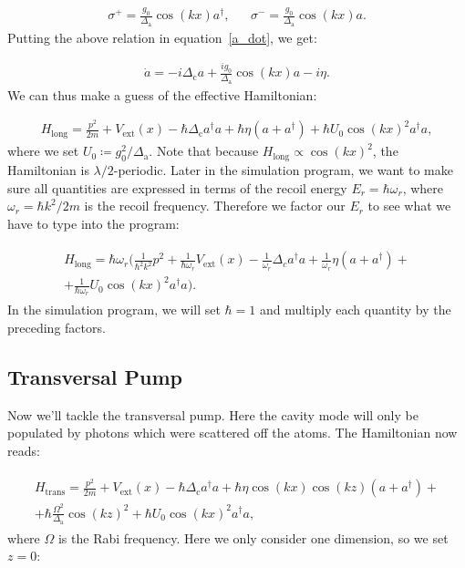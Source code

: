 \begin{align}
\sigma^+ = \frac{g_0 }{\Delta_\text{a}} \cos(kx) a^\dagger, && \sigma^- = \frac{g_0 }{\Delta_\text{a}} \cos(kx) a.
\end{align}Putting the above relation in equation~\ref{a_dot}, we get:

\begin{align}
\dot{a} = -i \Delta_\text{c} a + \frac{i g_0}{\Delta_\text{a}}  \cos(kx) a - i \eta.
\end{align}We can thus make a guess of the effective Hamiltonian:

\begin{align}
H_\text{long} = \frac{p^2}{2m} + V_\text{ext}(x) - \hbar \Delta_\text{c} a^\dagger a + \hbar \eta (a + a^\dagger) + \hbar U_0 \cos(kx)^2 a^\dagger a,
\end{align}where we set $U_0 \coloneqq g_0^2 / \Delta_\text{a}$. Note that because $H_\text{long} \propto \cos(kx)^2$, the Hamiltonian is $\lambda / 2$-periodic. Later in the simulation program, we want to make sure all quantities are expressed in terms of the recoil energy $E_r = \hbar \omega_r$, where $\omega_r = \hbar k^2 / 2m$ is the recoil frequency. Therefore we factor our $E_r$ to see what we have to type into the program:

\begin{align}
\begin{split}
H_\text{long} = \hbar \omega_r \biggl( \frac{1}{\hbar^2 k^2} p^2 + \frac{1}{\hbar \omega_r} V_\text{ext}(x) - \frac{1}{\omega_r} \Delta_c a^\dagger a + \frac{1}{\omega_r} \eta (a + a^\dagger) + \\
 + \frac{1}{\hbar \omega_r} U_0 \cos(kx)^2 a^\dagger a \biggr).
\end{split}
\end{align}In the simulation program, we will set $\hbar = 1$ and multiply each quantity by the preceding factors.

\subsection{Transversal Pump}

Now we'll tackle the transversal pump. Here the cavity mode will only be populated by photons which were scattered off the atoms. The Hamiltonian now reads:

\begin{align}
\begin{split}
H_\text{trans} = \frac{p^2}{2m} + V_\text{ext}(x) - \hbar \Delta_\text{c} a^\dagger a  + \hbar \eta \cos(kx) \cos(kz) (a + a^\dagger) + \\
+ \hbar \frac{\Omega^2}{\Delta_\text{a}} \cos(kz)^2 + \hbar U_0 \cos(kx)^2 a^\dagger a,
\end{split}
\end{align}where $\Omega$ is the Rabi frequency. Here we only consider one dimension, so we set $z=0$:

